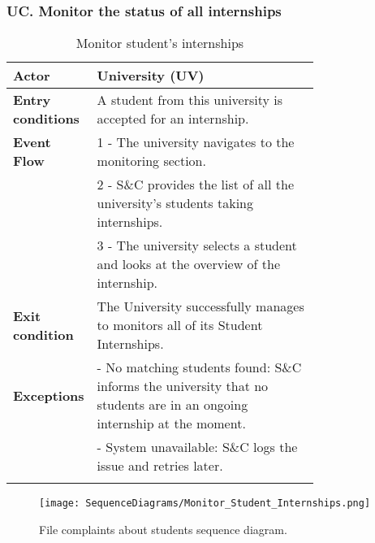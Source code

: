 \subsubsection*{UC\cuc . Monitor the status of all internships}
\begin{center}
    \begin{longtable}{|l|p{0.75\linewidth}|}
        \hline
        \textbf{Actor}            & University (UV) \\
        \hline
        \textbf{Entry conditions} & A student from this university is accepted for an internship. \\
        \hline
        \textbf{Event Flow}       & 1 - The university navigates to the monitoring section. \\
        & 2 - S\&C provides the list of all the university's students taking internships. \\
        & 3 - The university selects a student and looks at the overview of the internship. \\
        \hline
        \textbf{Exit condition}   & The University successfully manages to monitors all of its Student Internships. \\       
        \hline
        \textbf{Exceptions}       & - No matching students found: S\&C informs the university that no students are in an ongoing internship at the moment. \\
        & - System unavailable: S\&C logs the issue and retries later. \\
        \hline
        \caption{Monitor student's internships}
        \label{tab:monitor_student_internships_usecase}
    \end{longtable}
\end{center}

\begin{figure}[H]
    \begin{center}
        \texttt{[image: SequenceDiagrams/Monitor\_Student\_Internships.png]}
        \caption{File complaints about students sequence diagram.}
        \label{fig:monitor_student_internships_seqd}%
    \end{center}
\end{figure}

